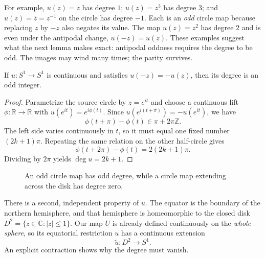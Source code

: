For example, \(u(z)=z\) has degree \(1\); \(u(z)=z^3\) has degree \(3\); and \(u(z)=\bar z=z^{-1}\) on the circle has degree \(-1\). Each is an \emph{odd} circle map because replacing \(z\) by \(-z\) also negates its value. The map \(u(z)=z^2\) has degree \(2\) and is even under the antipodal change, \(u(-z)=u(z)\). These examples suggest what the next lemma makes exact: antipodal oddness requires the degree to be odd. The images may wind many times; the parity survives.

\begin{lemma}
If $u:S^1\to S^1$ is continuous and satisfies $u(-z)=-u(z)$, then its degree is an odd integer.
\end{lemma}
\begin{proof}
Parametrize the source circle by $z=e^{it}$ and choose a continuous lift $\phi:\mathbb R\to\mathbb R$ with $u(e^{it})=e^{i\phi(t)}$. Since $u(e^{i(t+\pi)})=-u(e^{it})$, we have
\[
 \phi(t+\pi)-\phi(t)\in\pi+2\pi\mathbb Z.
\]
The left side varies continuously in $t$, so it must equal one fixed number $(2k+1)\pi$. Repeating the same relation on the other half-circle gives
\[
 \phi(t+2\pi)-\phi(t)=2(2k+1)\pi.
\]
Dividing by $2\pi$ yields $\deg u=2k+1$.
\end{proof}

\begin{figure}[htbp]
\centering
{}
\caption{An odd circle map has odd degree, while a circle map extending across the disk has degree zero.}
\label{fig:N20261110-degree}
\end{figure}

There is a second, independent property of \(u\). The equator is the boundary of the northern hemisphere, and that hemisphere is homeomorphic to the closed disk \(D^2=\{z\in\mathbb C:|z|\leq1\}\). Our map \(U\) is already defined continuously on the \emph{whole sphere}, so its equatorial restriction \(u\) has a continuous extension
\[
 \widetilde u:D^2\longrightarrow S^1.
\]
An explicit contraction shows why the degree must vanish.

